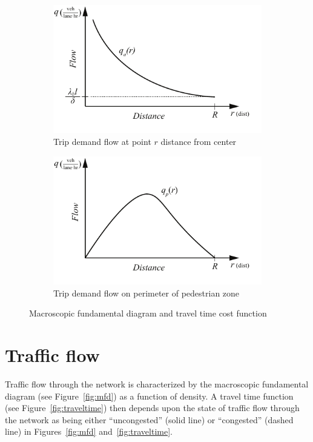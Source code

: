 \documentclass{article}
\begin{document}
\begin{figure}[!ht]
     \centering
     \hfill
     \begin{subfigure}[b]{0.45\textwidth}
         \centering
         \includegraphics[width=\textwidth]{diagram_flow_across}
         \caption{Trip demand flow at point $r$ distance from center}
         \label{fig:flowacross}
     \end{subfigure}
     \hfill
     \begin{subfigure}[b]{0.45\textwidth}
         \centering
         \includegraphics[width=\textwidth]{diagram_flow_perim}
         \caption{Trip demand flow on perimeter of pedestrian zone}
         \label{fig:perimflow}
     \end{subfigure}
     \hfill
     \caption{Macroscopic fundamental diagram and travel time cost function}
\end{figure}

\section{Traffic flow}
Traffic flow through the network is characterized by the macroscopic fundamental diagram (see Figure~\ref{fig:mfd}) as a function of density. A travel time function (see Figure~\ref{fig:traveltime}) then depends upon the state of traffic flow through the network as being either ``uncongested'' (solid line) or ``congested'' (dashed line) in Figures~\ref{fig:mfd} and~\ref{fig:traveltime}.
\end{document}
